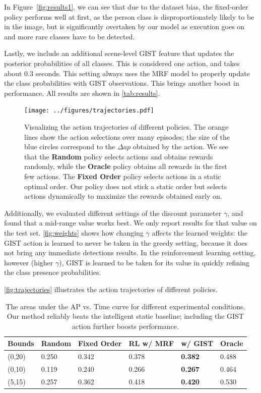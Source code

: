 In Figure~\autoref{fig:results1}, we can see that due to the dataset bias, the fixed-order policy performs well at first, as the person class is disproportionately likely to be in the image, but is significantly overtaken by our model as execution goes on and more rare classes have to be detected.

Lastly, we include an additional scene-level GIST feature that updates the posterior probabilities of all classes.
This is considered one action, and takes about $0.3$ seconds.
This setting always uses the MRF model to properly update the class probabilities with GIST observations.
This brings another boost in performance.
All results are shown in \autoref{tab:results}.

\begin{figure}[h!]
  \centering
  \texttt{[image: ../figures/trajectories.pdf]}
  \caption{
Visualizing the action trajectories of different policies.
The orange lines show the action selections over many episodes; the size of the blue circles correspond to the $\Delta ap$ obtained by the action.
We see that the \textbf{Random} policy selects actions and obtains rewards randomly, while the \textbf{Oracle} policy obtains all rewards in the first few actions.
The \textbf{Fixed Order} policy selects actions in a static optimal order.
Our policy does not stick a static order but selects actions dynamically to maximize the rewards obtained early on.
}
  \label{fig:trajectories}
\end{figure}

Additionally, we evaluated different settings of the discount parameter $\gamma$, and found that a mid-range value works best.
We only report results for that value on the test set.
\autoref{fig:weights} shows how changing $\gamma$ affects the learned weights: the GIST action is learned to never be taken in the greedy setting, because it does not bring any immediate detections results.
In the reinforcement learning setting, however (higher $\gamma$), GIST is learned to be taken for its value in quickly refining the class presence probabilities.

\autoref{fig:trajectories} illustrates the action trajectories of different policies.

\begin{table}[t]
\caption{
The areas under the AP vs. Time curve for different experimental conditions.
Our method reliably beats the intelligent static baseline; including the GIST action further boosts performance.}
\label{tab:results}
\begin{center}
\begin{tabular}{|l|l|l|l|l|l|}
\hline
Bounds & Random & Fixed Order & RL w/ MRF & w/ GIST         & Oracle \\ \hline
(0,20) & 0.250  & 0.342       & 0.378     & \textbf{0.382}  & 0.488 \\ 
(0,10) & 0.119  & 0.240       & 0.266     & \textbf{0.267}  & 0.464 \\ 
(5,15) & 0.257  & 0.362       & 0.418     & \textbf{0.420}  & 0.530 \\ \hline
\end{tabular}
\end{center}
\end{table}
